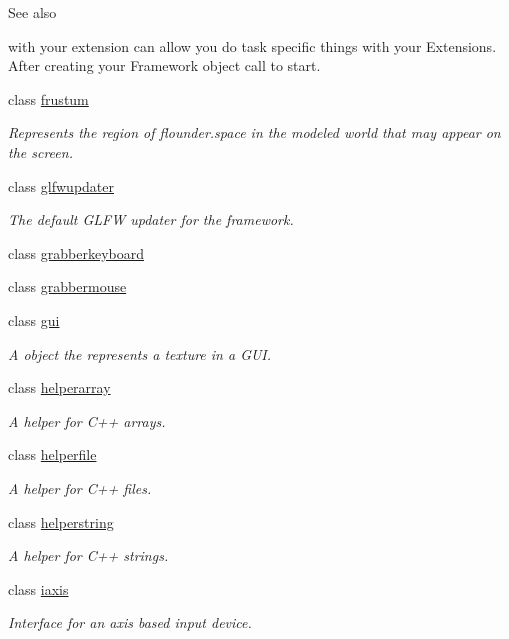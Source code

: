 \begin{DoxyCompactItemize}
\begin{DoxyCompactList}
\begin{DoxySeeAlso}{See also}
\end{DoxySeeAlso}
with your extension can allow you do task specific things with your Extensions. After creating your Framework object call  to start. \end{DoxyCompactList}\item 
class \hyperlink{classflounder_1_1frustum}{frustum}
\begin{DoxyCompactList}\small\item\em Represents the region of flounder.\+space in the modeled world that may appear on the screen. \end{DoxyCompactList}\item 
class \hyperlink{classflounder_1_1glfwupdater}{glfwupdater}
\begin{DoxyCompactList}\small\item\em The default G\+L\+FW updater for the framework. \end{DoxyCompactList}\item 
class \hyperlink{classflounder_1_1grabberkeyboard}{grabberkeyboard}
\item 
class \hyperlink{classflounder_1_1grabbermouse}{grabbermouse}
\item 
class \hyperlink{classflounder_1_1gui}{gui}
\begin{DoxyCompactList}\small\item\em A object the represents a texture in a G\+UI. \end{DoxyCompactList}\item 
class \hyperlink{classflounder_1_1helperarray}{helperarray}
\begin{DoxyCompactList}\small\item\em A helper for C++ arrays. \end{DoxyCompactList}\item 
class \hyperlink{classflounder_1_1helperfile}{helperfile}
\begin{DoxyCompactList}\small\item\em A helper for C++ files. \end{DoxyCompactList}\item 
class \hyperlink{classflounder_1_1helperstring}{helperstring}
\begin{DoxyCompactList}\small\item\em A helper for C++ strings. \end{DoxyCompactList}\item 
class \hyperlink{classflounder_1_1iaxis}{iaxis}
\begin{DoxyCompactList}\small\item\em Interface for an axis based input device. \end{DoxyCompactList}\item 

\end{DoxyCompactItemize}
